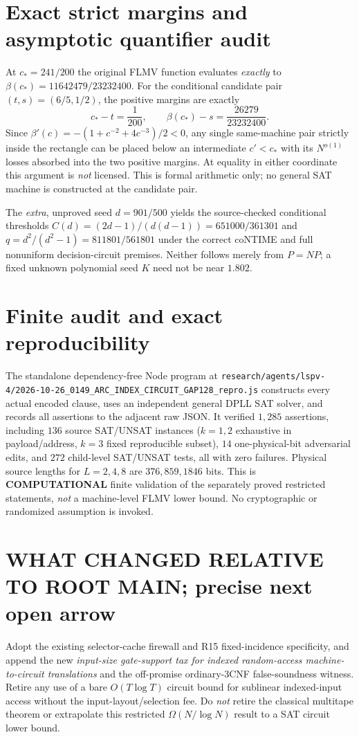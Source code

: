 \documentclass[11pt]{article}
\begin{document}
\section{Exact strict margins and asymptotic quantifier audit}
At $c_*=241/200$ the original FLMV function evaluates \emph{exactly} to
$\beta(c_*)=11642479/23232400$. For the conditional candidate pair
$(t,s)=(6/5,1/2)$, the positive margins are exactly
\[
c_*-t=\frac1{200},\qquad \beta(c_*)-s=\frac{26279}{23232400}.
\]
Since $\beta'(c)=-(1+c^{-2}+4c^{-3})/2<0$, any single same-machine pair strictly inside the rectangle can be placed below an intermediate $c'<c_*$ with its $N^{o(1)}$ losses absorbed into the two positive margins. At equality in either coordinate this argument is \emph{not} licensed. This is formal arithmetic only; no general SAT machine is constructed at the candidate pair.

The \emph{extra}, unproved seed $d=901/500$ yields the source-checked conditional thresholds
$C(d)=(2d-1)/(d(d-1))=651000/361301$ and
$q=d^2/(d^2-1)=811801/561801$
under the correct coNTIME and full nonuniform decision-circuit premises. Neither follows merely from $P=NP$; a fixed unknown polynomial seed $K$ need not be near $1.802$.

\section{Finite audit and exact reproducibility}
The standalone dependency-free Node program at
\texttt{research/agents/lspv-4/2026-10-26\_0149\_ARC\_INDEX\_CIRCUIT\_GAP128\_repro.js}
constructs every actual encoded clause, uses an independent general DPLL SAT solver, and records all assertions to the adjacent raw JSON. It verified $1{,}285$ assertions, including $136$ source SAT/UNSAT instances ($k=1,2$ exhaustive in payload/address, $k=3$ fixed reproducible subset), $14$ one-physical-bit adversarial edits, and $272$ child-level SAT/UNSAT tests, all with zero failures. Physical source lengths for $L=2,4,8$ are $376,859,1846$ bits. This is \textbf{COMPUTATIONAL} finite validation of the separately proved restricted statements, \emph{not} a machine-level FLMV lower bound. No cryptographic or randomized assumption is invoked.

\section{WHAT CHANGED RELATIVE TO ROOT MAIN; precise next open arrow}
Adopt the existing selector-cache firewall and R15 fixed-incidence specificity, and append the new \emph{input-size gate-support tax for indexed random-access machine-to-circuit translations} and the off-promise ordinary-3CNF false-soundness witness. Retire any use of a bare $O(T\log T)$ circuit bound for sublinear indexed-input access without the input-layout/selection fee. Do \emph{not} retire the classical multitape theorem or extrapolate this restricted $\Omega(N/\log N)$ result to a SAT circuit lower bound.
\end{document}
